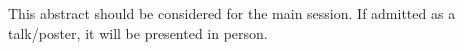 \documentclass[11pt]{article}
\begin{document}
%
%
%
\newpage
This abstract should be considered for the main session. If admitted as a talk/poster, it will be presented in person.
\printbibliography
\end{document}

